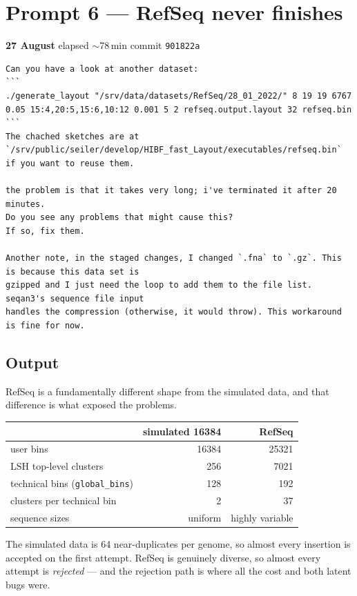 \documentclass[11pt,a4paper]{article}
\newenvironment{promptbox}{\medskip}{\medskip}
\newcommand{\code}[1]{\lstinline[basicstyle=\ttfamily\small]!#1!}
\newcommand{\sha}[1]{\texttt{#1}}
\newcommand{\bad}[1]{\textcolor{warn}{#1}}
\begin{document}
\section{Prompt 6 --- RefSeq never finishes}
\textbf{27 August} \textperiodcentered{} elapsed ${\sim}$78\,min \textperiodcentered{} commit \sha{901822a}
\begin{promptbox}
\begin{lstlisting}[style=promptstyle]
Can you have a look at another dataset:
```
./generate_layout "/srv/data/datasets/RefSeq/28_01_2022/" 8 19 19 6767 0.05 15:4,20:5,15:6,10:12 0.001 5 2 refseq.output.layout 32 refseq.bin
```
The chached sketches are at `/srv/public/seiler/develop/HIBF_fast_Layout/executables/refseq.bin`
if you want to reuse them.

the problem is that it takes very long; i've terminated it after 20 minutes.
Do you see any problems that might cause this?
If so, fix them.

Another note, in the staged changes, I changed `.fna` to `.gz`. This is because this data set is
gzipped and I just need the loop to add them to the file list. seqan3's sequence file input
handles the compression (otherwise, it would throw). This workaround is fine for now.
\end{lstlisting}
\end{promptbox}
\subsection*{Output}

RefSeq is a fundamentally different shape from the simulated data, and that difference is what
exposed the problems.

\begin{longtable}{@{}p{6.6cm}rr@{}}
\toprule
 & \textbf{simulated 16384} & \textbf{RefSeq} \\
\midrule
\endhead
user bins & 16384 & 25321 \\
LSH top-level clusters & 256 & \bad{7021} \\
technical bins (\code{global_bins}) & 128 & 192 \\
clusters per technical bin & 2 & \bad{37} \\
sequence sizes & uniform & highly variable \\
\bottomrule
\end{longtable}

\noindent The simulated data is 64 near-duplicates per genome, so almost every insertion is
accepted on the first attempt. RefSeq is genuinely diverse, so almost every attempt is
\emph{rejected} --- and the rejection path is where all the cost and both latent bugs were.
\end{document}
